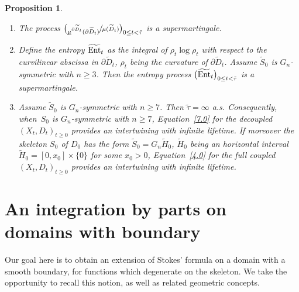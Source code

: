 \documentclass[10pt]{amsart}
\theoremstyle{plain}
\newtheorem{prop}[thm]{Proposition}
\theoremstyle{definition}
\newcommand{\usm}{{\underline{\smash{\mu}}}}
\let\di\displaystyle
\let\wi\widetilde
\begin{document}
\skpt
\begin{prop}
\label{P5.4.4}
\begin{enumerate}
\item The process $\di \bigl(\sfrac{\usm^{\partial\wi D_t}(\partial\wi D_t)}{\mu(\wi D_t)}\bigr)_{0\le t<\tilde \tau}$ is a supermartingale.
\item Define the entropy $\widetilde{\rm{Ent}}_t$ as the integral of $\rho_t\log \rho_t$ with respect to the curvilinear abscissa in $\partial \tilde D_t$, $\rho_t$ being the curvature of $\partial \tilde D_t$.
Assume $\tilde S_0$ is $G_n$-symmetric with $n\ge 3$. Then the entropy process $\bigl(\widetilde{\rm{Ent}}_t \bigr)_{0\le t<\tilde \tau}$ is a supermartingale.
\item Assume $\tilde S_0$ is $G_n$-symmetric with $n\ge 7$. Then $\tilde \tau=\infty$ a.s. Consequently, when~$ S_0$ is $G_n$-symmetric with $n\ge 7$,
Equation~\eqref{7.0} for the decoupled $(X_t,D_t)_{t\ge 0}$ provides an intertwining with infinite lifetime. If moreover the skeleton $S_0$ of $D_0$ has the form $\wi S_0=G_n\wi H_0$, $\wi H_0$ being an horizontal interval $\wi H_0=[0, x_0]\times \{0\}$ for some $ x_0>0$, Equation~\eqref{4.0} for the full coupled $(X_t,D_t)_{t\ge 0}$ provides an intertwining with infinite lifetime.
\end{enumerate}
\end{prop}

\appendix
\renewcommand{\theequation}{\Alph{section}.\arabic{equation}}

\section{An integration by parts on domains with boundary}
\label{Section2}

Our goal here is to obtain an extension of Stokes' formula on a domain with a smooth boundary, for functions which degenerate on the skeleton.
We take the opportunity to recall this notion, as well as related geometric concepts.
\end{document}
